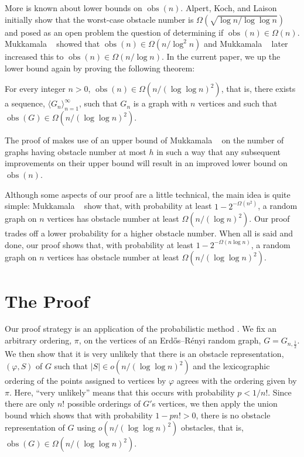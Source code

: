 \documentclass[12pt]{article}
\DeclareMathOperator{\obs}{obs}
\begin{document}
More is known about lower bounds on $\obs(n)$.  Alpert, Koch, and Laison \cite{alpert.koch.ea:obstacle}
initially show that the worst-case obstacle number is
$\Omega\left(\sqrt{\log n/\log\log n}\right)$ and posed as an open problem the question
of determining if $\obs(n)\in\Omega(n)$.
Mukkamala \etal\ \cite{mukkamala.pach.ea:graphs} showed that $\obs(n)\in
\Omega(n/\log^2 n)$ and Mukkamala \etal\ \cite{mukkamala.pach.ea:lower}
later increased this to $\obs(n)\in\Omega(n/\log n)$.  In the current paper,
we up the lower bound again by proving the following theorem:
\begin{thm}
  For every integer $n>0$, $\obs(n)\in\Omega(n/(\log\log n)^2)$, that is, there
  exists a sequence, $\langle G_n\rangle_{n=1}^{\infty}$, such that $G_n $ is a graph with $n$ vertices and such that $\obs(G)\in\Omega(n/(\log\log
  n)^2)$.
\end{thm}

The proof of  makes use of an upper bound of Mukkamala \etal\
\cite[Theorem~1]{mukkamala.pach.ea:lower} on the number of graphs having
obstacle number at most $h$ in such a way that any subsequent improvements
on their upper bound will result in an improved lower bound on $\obs(n)$.

Although some aspects of our proof are a little technical, the main
idea is quite simple:  Mukkamala \etal\ \cite{mukkamala.pach.ea:lower}
show that, with probability at least $1-2^{-\Omega(n^2)}$, a random
graph on $n$ vertices has obstacle number at least $\Omega(n/(\log n)^2)$.
Our proof trades off a lower probability for a higher obstacle number.
When all is said and done, our proof shows that, with probability at least
$1-2^{-\Omega(n\log n)}$, a random graph on $n$ vertices has obstacle
number at least $\Omega(n/(\log\log n)^2)$.

\section{The Proof}

Our proof strategy is an application of the probabilistic method
\cite{alon.spencer:probabilistic}.  We fix an arbitrary ordering, $\pi$,
on the vertices of an Erd\H{o}s--R\'enyi random graph, $G=G_{n,\frac
12}$.  We then show that it is very unlikely that there is an obstacle
representation, $(\varphi, S)$ of $G$ such that $|S|\in o(n/(\log\log
n)^2)$ and the lexicographic ordering of the points assigned to
vertices by $\varphi$ agrees with the ordering given by $\pi$.  Here,
``very unlikely'' means that this occurs with probability $p<1/n!$.
Since there are only $n!$ possible orderings of $G'$s vertices, we then
apply the union bound which shows that with probability $1-pn!>0$, there
is no obstacle representation of $G$ using $o(n/(\log\log n)^2)$ obstacles,
that is, $\obs(G) \in \Omega(n/(\log\log n)^2)$.
\end{document}
